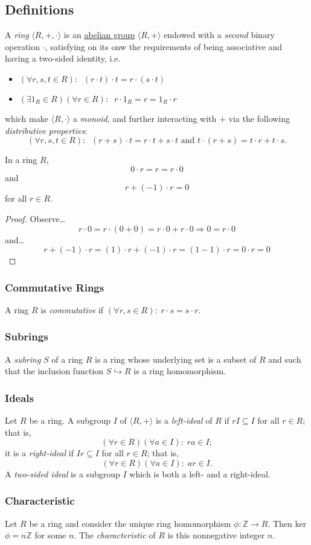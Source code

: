\subsection{Definitions}\label{ringdefinition}
A \emph{ring} $\langle R, +, \cdot \rangle$ is an \hyperref[abeliangroupdefinition]{abelian group} $\langle R,+ \rangle$ endowed with a \emph{second}
binary operation $\cdot$, satisfying on its onw the requirements of being associative and having a two-sided identity, i.e.
\begin{itemize}
  \item $(\forall r,s,t \in R): \; \; (r \cdot t) \cdot t = r \cdot (s \cdot t)$
  \item $(\exists 1_R \in R) (\forall r \in R): \; \; r \cdot 1_R = r = 1_R \cdot r$
\end{itemize}
which make $\langle R, \cdot \rangle$ a \emph{monoid}, and further interacting with $+$ via the following \emph{distributive properties}:
$$(\forall r,s,t \in R): \; \; (r+s)\cdot t = r \cdot t + s \cdot t \textrm{ and } t \cdot (r + s) = t \cdot r + t \cdot s.$$

\begin{lemma}
In a ring $R$,
$$0 \cdot r = r = r \cdot 0$$
and
$$r + (-1) \cdot r = 0$$
for all $r \in R.$
\end{lemma}

\begin{proof}
Observe\dots
$$r \cdot 0 = r \cdot (0 + 0) = r \cdot 0 + r \cdot 0 \Rightarrow 0 = r \cdot 0$$
and\dots
$$r + (-1) \cdot r = (1) \cdot r + (-1) \cdot r = (1 - 1) \cdot r = 0 \cdot r = 0$$
\end{proof}

\subsubsection{Commutative Rings}\label{commutativeringdefinition}
A ring $R$ is \emph{commutative} if $(\forall r,s \in R): \; r \cdot s = s \cdot r$.

\subsubsection{Subrings}\label{subrings}
A \emph{subring} $S$ of a ring $R$ is a ring whose underlying set is a subset of $R$ and such that
the inclusion function $S \hookrightarrow R$ is a ring homomorphism.

\subsubsection{Ideals}\label{ideal}
Let $R$ be a ring. A subgroup $I$ of $\langle R,+ \rangle$ is a \emph{left-ideal} of $R$ if $rI \subseteq I$
for all $r \in R$; that is,
$$(\forall r \in R)(\forall a \in I): \; ra \in I;$$
it is a \emph{right-ideal} if $Ir \subseteq I$ for all $r \in R$; that is,
$$(\forall r \in R)(\forall a \in I): \; ar \in I.$$
A \emph{two-sided ideal} is a subgroup $I$ which is both a left- and a right-ideal.

\subsubsection{Characteristic}\label{characteristic}
Let $R$ be a ring and consider the unique ring homomorphism $\phi: \mathbb{Z} \rightarrow R$. Then ker$\phi = n\mathbb{Z}$
for some $n$. The \emph{characteristic} of $R$ is this nonnegative integer $n$.